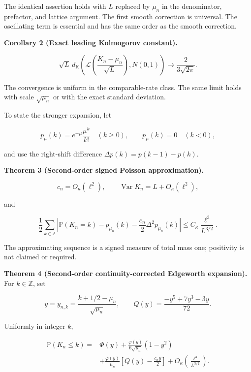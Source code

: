 \documentclass[
  11pt,
]{article}
\begin{document}
The identical assertion holds with \(L\) replaced by \(\mu_n\) in the
denominator, prefactor, and lattice argument. The first smooth
correction is universal. The oscillating term is essential and has the
same order as the smooth correction.


\textbf{Corollary 2 (Exact leading Kolmogorov constant).}

\[
\sqrt L\,d_{\mathrm K}\left(
\mathcal L\left(\frac{K_n-\mu_n}{\sqrt L}\right),N(0,1)
\right)
\longrightarrow\frac{2}{3\sqrt{2\pi}}.
\tag{3}
\]

The convergence is uniform in the comparable-rate class. The same limit
holds with scale \(\sqrt{\mu_n}\) or with the exact standard deviation.

To state the stronger expansion, let

\[
p_\mu(k)=e^{-\mu}\frac{\mu^k}{k!}\quad(k\ge0),\qquad
p_\mu(k)=0\quad(k<0),
\]

and use the right-shift difference \(\Delta p(k)=p(k-1)-p(k)\).


\textbf{Theorem 3 (Second-order signed Poisson approximation).}

\[
c_n=O_\kappa(\ell^2),\qquad
\operatorname{Var}K_n=L+O_\kappa(\ell^2),
\tag{4}
\]

and

\[
\frac12\sum_{k\in\mathbb Z}
\left|\mathbb P(K_n=k)-p_{\mu_n}(k)
-\frac{c_n}{2}\Delta^2p_{\mu_n}(k)\right|
\le C_\kappa\frac{\ell^3}{L^{3/2}}.
\tag{5}
\]

The approximating sequence is a signed measure of total mass one;
positivity is not claimed or required.


\textbf{Theorem 4 (Second-order continuity-corrected Edgeworth
expansion).} For \(k\in\mathbb Z\), set

\[
y=y_{n,k}=\frac{k+1/2-\mu_n}{\sqrt{\mu_n}},\qquad
Q(y)=\frac{-y^5+7y^3-3y}{72}.
\]

Uniformly in integer \(k\),

\[
\begin{split}
\mathbb P(K_n\le k)
={}&\Phi(y)+\frac{\varphi(y)}{6\sqrt{\mu_n}}(1-y^2)\\
&+\frac{\varphi(y)}{\mu_n}
\left[Q(y)-\frac{c_n y}{2}\right]
+O_\kappa\left(\frac{\ell^3}{L^{3/2}}\right).
\end{split}
\tag{6}
\]
\end{document}
